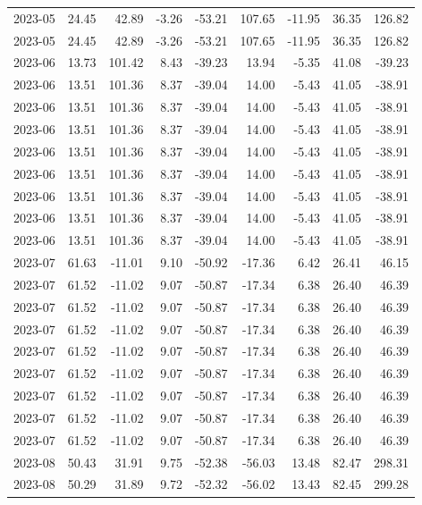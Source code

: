 \begin{table}[ht]
\begin{tabular}{lrrrrrrrr}
  2023-05 & 24.45 & 42.89 & -3.26 & -53.21 & 107.65 & -11.95 & 36.35 & 126.82 \\ 
  2023-05 & 24.45 & 42.89 & -3.26 & -53.21 & 107.65 & -11.95 & 36.35 & 126.82 \\ 
  2023-06 & 13.73 & 101.42 & 8.43 & -39.23 & 13.94 & -5.35 & 41.08 & -39.23 \\ 
  2023-06 & 13.51 & 101.36 & 8.37 & -39.04 & 14.00 & -5.43 & 41.05 & -38.91 \\ 
  2023-06 & 13.51 & 101.36 & 8.37 & -39.04 & 14.00 & -5.43 & 41.05 & -38.91 \\ 
  2023-06 & 13.51 & 101.36 & 8.37 & -39.04 & 14.00 & -5.43 & 41.05 & -38.91 \\ 
  2023-06 & 13.51 & 101.36 & 8.37 & -39.04 & 14.00 & -5.43 & 41.05 & -38.91 \\ 
  2023-06 & 13.51 & 101.36 & 8.37 & -39.04 & 14.00 & -5.43 & 41.05 & -38.91 \\ 
  2023-06 & 13.51 & 101.36 & 8.37 & -39.04 & 14.00 & -5.43 & 41.05 & -38.91 \\ 
  2023-06 & 13.51 & 101.36 & 8.37 & -39.04 & 14.00 & -5.43 & 41.05 & -38.91 \\ 
  2023-06 & 13.51 & 101.36 & 8.37 & -39.04 & 14.00 & -5.43 & 41.05 & -38.91 \\ 
  2023-07 & 61.63 & -11.01 & 9.10 & -50.92 & -17.36 & 6.42 & 26.41 & 46.15 \\ 
  2023-07 & 61.52 & -11.02 & 9.07 & -50.87 & -17.34 & 6.38 & 26.40 & 46.39 \\ 
  2023-07 & 61.52 & -11.02 & 9.07 & -50.87 & -17.34 & 6.38 & 26.40 & 46.39 \\ 
  2023-07 & 61.52 & -11.02 & 9.07 & -50.87 & -17.34 & 6.38 & 26.40 & 46.39 \\ 
  2023-07 & 61.52 & -11.02 & 9.07 & -50.87 & -17.34 & 6.38 & 26.40 & 46.39 \\ 
  2023-07 & 61.52 & -11.02 & 9.07 & -50.87 & -17.34 & 6.38 & 26.40 & 46.39 \\ 
  2023-07 & 61.52 & -11.02 & 9.07 & -50.87 & -17.34 & 6.38 & 26.40 & 46.39 \\ 
  2023-07 & 61.52 & -11.02 & 9.07 & -50.87 & -17.34 & 6.38 & 26.40 & 46.39 \\ 
  2023-07 & 61.52 & -11.02 & 9.07 & -50.87 & -17.34 & 6.38 & 26.40 & 46.39 \\ 
  2023-08 & 50.43 & 31.91 & 9.75 & -52.38 & -56.03 & 13.48 & 82.47 & 298.31 \\ 
  2023-08 & 50.29 & 31.89 & 9.72 & -52.32 & -56.02 & 13.43 & 82.45 & 299.28 \\ 

\end{tabular}
\end{table}
